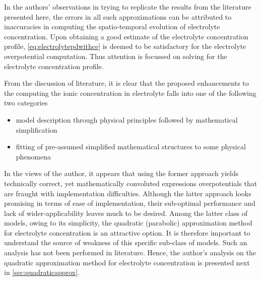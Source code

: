 
In  the  authors'   observations  in  trying  to  replicate   the  results  from
the  literature  presented here,  the  errors  in  all such  approximations  can
be  attributed  to  inaccuracies  in  computing  the  spatio-temporal  evolution
of  electrolyte   concentration.  Upon   obtaining  a   good  estimate   of  the
electrolyte concentration profile, \cref{eq:electrolytepdwithce} is deemed to be
satisfactory for  the electrolyte  overpotential computation. Thus  attention is
focussed on solving for the electrolyte concentration profile.

From the discussion of literature, it is clear that the proposed enhancements to
the  computing the  ionic concentration  in electrolyte  falls into  one of  the
following two categories
\begin{itemize}
    \item model description through physical principles followed by mathematical
        simplification
    \item fitting of pre-assumed simplified mathematical structures to some
        physical phenomena
\end{itemize}

In the  views of the  author, it appears that  using the former  approach yields
technically  correct, yet  mathematically convoluted  expressions overpotentials
that are fraught with implementation  difficulties. Although the latter approach
looks  promising  in   terms  of  ease  of   implementation,  their  sub-optimal
performance and lack of wider-applicability leaves much to be desired. Among the
latter  class of  models, owing  to  its simplicity,  the quadratic  (parabolic)
approximation method for  electrolyte concentration is an  attractive option. It
is therefore  important to understand  the source  of weakness of  this specific
sub-class of  models. Such  an analysis  has not  been performed  in literature.
Hence,  the  author's  analysis  on   the  quadratic  approximation  method  for
electrolyte concentration is presented next in \cref{sec:quadraticapprox}.




